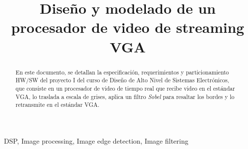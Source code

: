 \documentclass[10pt, letterpaper, conference]{IEEEtran}
\begin{document}
\title{Dise\~no y modelado de un procesador de video de streaming VGA}




\author{
  \vspace{3pt}
	\vspace{3pt}
\vspace{-18pt}
}


\maketitle

%


\begin{abstract}
En este documento, se detallan la especificaci\'on, requerimientos y 
particionamiento HW/SW del proyecto I del curso de Dise\~no de Alto Nivel de
Sistemas Electr\'onicos, que consiste en un procesador de video de tiempo real
que recibe video en el est\'andar VGA, lo traslada a escala de grises, aplica 
un filtro \emph{Sobel} para resaltar los bordes y lo retransmite en el 
est\'andar VGA.
\end{abstract}

\begin{IEEEkeywords}
DSP, Image processing, Image edge detection, Image filtering
\end{IEEEkeywords}
\end{document}
